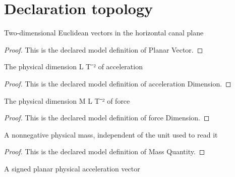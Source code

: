 \section{Declaration topology}
\begin{definition}
  \label{def:physics:phyx-mini-0760:phyxminiproblems-problemphyxmini0760-planarvector}
  Two-dimensional Euclidean vectors in the horizontal canal plane
\end{definition}
\begin{proof}
  This is the declared model definition of Planar Vector.
\end{proof}
\begin{definition}
  \label{def:physics:phyx-mini-0760:phyxminiproblems-problemphyxmini0760-accelerationdimension}
  The physical dimension L T⁻² of acceleration
\end{definition}
\begin{proof}
  This is the declared model definition of acceleration Dimension.
\end{proof}
\begin{definition}
  \label{def:physics:phyx-mini-0760:phyxminiproblems-problemphyxmini0760-forcedimension}
  The physical dimension M L T⁻² of force
\end{definition}
\begin{proof}
  This is the declared model definition of force Dimension.
\end{proof}
\begin{definition}
  \label{def:physics:phyx-mini-0760:phyxminiproblems-problemphyxmini0760-massquantity}
  A nonnegative physical mass, independent of the unit used to read it
\end{definition}
\begin{proof}
  This is the declared model definition of Mass Quantity.
\end{proof}
\begin{definition}
  \label{def:physics:phyx-mini-0760:phyxminiproblems-problemphyxmini0760-planaraccelerationquantity}
  A signed planar physical acceleration vector
\end{definition}
